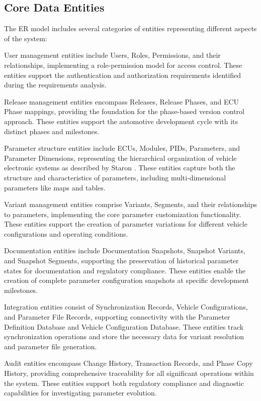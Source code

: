 \subsection{Core Data Entities}
\label{subsec:core-data-entities}

The \ac{ER} model includes several categories of entities representing different aspects of the system:

User management entities include Users, Roles, Permissions, and their relationships, implementing a role-permission model for access control. These entities support the authentication and authorization requirements identified during the requirements analysis.

Release management entities encompass Releases, Release Phases, and \ac{ECU} Phase mappings, providing the foundation for the phase-based version control approach. These entities support the automotive development cycle with its distinct phases and milestones.

Parameter structure entities include \acp{ECU}, Modules, \acp{PID}, Parameters, and Parameter Dimensions, representing the hierarchical organization of vehicle electronic systems as described by Staron \cite{staron2021automotive}. These entities capture both the structure and characteristics of parameters, including multi-dimensional parameters like maps and tables.

Variant management entities comprise Variants, Segments, and their relationships to parameters, implementing the core parameter customization functionality. These entities support the creation of parameter variations for different vehicle configurations and operating conditions.

Documentation entities include Documentation Snapshots, Snapshot Variants, and Snapshot Segments, supporting the preservation of historical parameter states for documentation and regulatory compliance. These entities enable the creation of complete parameter configuration snapshots at specific development milestones.

Integration entities consist of Synchronization Records, Vehicle Configurations, and Parameter File Records, supporting connectivity with the Parameter Definition Database and Vehicle Configuration Database. These entities track synchronization operations and store the necessary data for variant resolution and parameter file generation.

Audit entities encompass Change History, Transaction Records, and Phase Copy History, providing comprehensive traceability for all significant operations within the system. These entities support both regulatory compliance and diagnostic capabilities for investigating parameter evolution.

